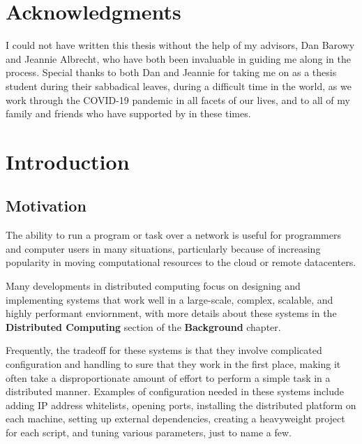 \documentclass[twoside]{report}
\newcommand{\todoi}[1]{\todo[inline, color=blue!20]{TODO: {#1}}}
\begin{document}
\chapter*{Acknowledgments}

I could not have written this thesis without the help of my advisors, Dan Barowy and Jeannie Albrecht, who have both been invaluable in guiding me along in the process. Special thanks to both Dan and Jeannie for taking me on as a thesis student during their sabbadical leaves, during a difficult time in the world, as we work through the COVID-19 pandemic in all facets of our lives, and to all of my family and friends who have supported by in these times.

\todoi{Expand}


\chapter{Introduction}

\section{Motivation}

The ability to run a program or task over a network is useful for programmers and computer users in many situations, particularly because of increasing popularity in moving computational resources to the cloud or remote datacenters.

Many developments in distributed computing focus on designing and implementing systems that work well in a large-scale, complex, scalable, and highly performant enviornment, with more details about these systems in the \textbf{Distributed Computing} section of the \textbf{Background} chapter.

Frequently, the tradeoff for these systems is that they involve  complicated configuration and handling to sure that they work in the first place, making it often take a disproportionate amount of effort to perform a simple task in a distributed manner.
Examples of configuration needed in these systems include adding IP address whitelists, opening ports, installing the distributed platform on each machine, setting up external dependencies, creating a heavyweight project for each script, and tuning various parameters, just to name a few.
\end{document}
